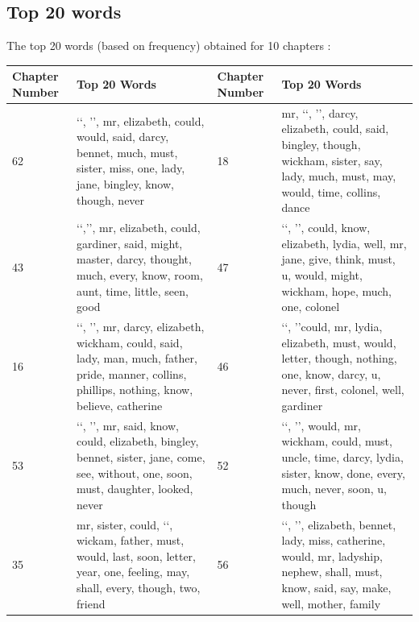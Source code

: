 \documentclass{article}
\begin{document}
\subsection{Top 20 words}
\begin{flushleft}
	The top 20 words (based on frequency) obtained for 10 chapters :
	\begin{center}
		\begin{tabular}{|p{}|p{}||p{}|p{}|}
			\hline
			Chapter Number & Top 20 Words                                                                                                                     & Chapter Number & Top 20 Words                                                                                                                                  \\
			\hline
			\hline
			62 & \lq\lq, \rq\rq, mr, elizabeth, could, would, said, darcy, bennet, much, must, sister, miss, one, lady, jane, bingley, know, though, never &
			18 & mr, \lq\lq, \rq\rq, darcy, elizabeth, could, said, bingley, though, wickham, sister, say, lady, much, must, may, would, time, collins, dance\\
			\hline
            43 & \lq\lq,\rq\rq, mr, elizabeth, could, gardiner, said, might, master, darcy, thought, much, every, know, room, aunt, time, little, seen, good & 
            47 &  \lq\lq, \rq\rq, could, know, elizabeth, lydia, well, mr, jane, give, think, must, u, would, might, wickham, hope, much, one, colonel  \\
			\hline
			16 & \lq\lq, \rq\rq, mr, darcy, elizabeth, wickham, could, said, lady, man, much, father, pride, manner, collins, phillips, nothing, know, believe, catherine &
			46 & \lq\lq, \rq\rq could, mr, lydia, elizabeth, must, would, letter, though, nothing, one, know, darcy, u, never, first, colonel, well, gardiner\\
			\hline
			53 & \lq\lq, \rq\rq, mr, said, know, could, elizabeth, bingley, bennet, sister, jane, come, see, without, one, soon, must, daughter, looked, never &
			52 & \lq\lq, \rq\rq, would, mr, wickham, could, must, uncle, time, darcy, lydia, sister, know, done, every, much, never, soon, u, though  \\
			\hline
			35 & mr, sister, could, \lq\lq, wickam, father, must, would, last, soon, letter, year, one, feeling, may, shall, every, though, two, friend   &
			56 & \lq\lq, \rq\rq, elizabeth, bennet, lady, miss, catherine, would, mr, ladyship, nephew, shall, must, know, said, say, make, well, mother, family \\
			\hline
		\end{tabular}
	\end{center}
\end{flushleft}
\end{document}
